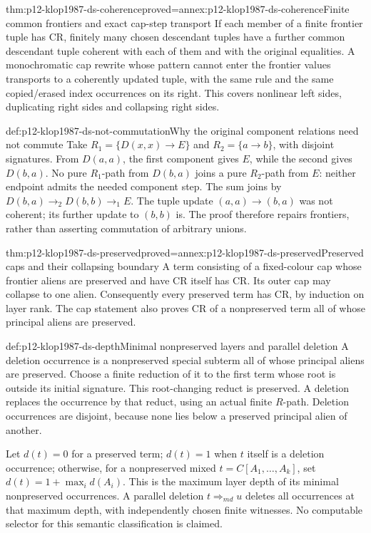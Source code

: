 \begin{hblemma}{thm:p12-klop1987-ds-coherence}{proved=annex:p12-klop1987-ds-coherence}{Finite common frontiers and exact cap-step transport}
If each member of a finite frontier tuple has CR, finitely many
chosen descendant tuples have a further common descendant tuple
coherent with each of them and with the original equalities.
A monochromatic cap rewrite whose pattern cannot enter the frontier
values transports to a coherently updated tuple, with the same
rule and the same copied/erased index occurrences on its right.
This covers nonlinear left sides, duplicating right sides and
collapsing right sides.
\end{hblemma}

\begin{hbexample}{def:p12-klop1987-ds-not-commutation}{Why the original component relations need not commute}
Take \(R_1=\{D(x,x)\to E\}\) and \(R_2=\{a\to b\}\),
with disjoint signatures. From \(D(a,a)\), the first component
gives \(E\), while the second gives \(D(b,a)\). No pure
\(R_1\)-path from \(D(b,a)\) joins a pure \(R_2\)-path
from \(E\): neither endpoint admits the needed component step.
The sum joins by \(D(b,a)\to_2D(b,b)\to_1E\).
The tuple update \((a,a)\to(b,a)\) was not coherent; its
further update to \((b,b)\) is. The proof therefore repairs
frontiers, rather than asserting commutation of arbitrary unions.
\end{hbexample}

\begin{hblemma}{thm:p12-klop1987-ds-preserved}{proved=annex:p12-klop1987-ds-preserved}{Preserved caps and their collapsing boundary}
A term consisting of a fixed-colour cap whose frontier aliens are
preserved and have CR itself has CR. Its outer cap may collapse
to one alien. Consequently every preserved term has CR, by
induction on layer rank. The cap statement also proves CR of a
nonpreserved term all of whose principal aliens are preserved.
\end{hblemma}

\begin{hbdefinition}{def:p12-klop1987-ds-depth}{Minimal nonpreserved layers and parallel deletion}
A deletion occurrence is a nonpreserved special subterm all of
whose principal aliens are preserved. Choose a finite reduction
of it to the first term whose root is outside its initial signature.
This root-changing reduct is preserved. A deletion replaces the
occurrence by that reduct, using an actual finite \(R\)-path.
Deletion occurrences are disjoint, because none lies below a
preserved principal alien of another.

Let \(d(t)=0\) for a preserved term; \(d(t)=1\) when \(t\)
itself is a deletion occurrence; otherwise, for a nonpreserved
mixed \(t=C[A_1,\ldots,A_k]\), set
\(d(t)=1+\max_i d(A_i)\). This is the maximum layer depth
of its minimal nonpreserved occurrences. A parallel deletion
\(t\Rightarrow_{
m d}u\) deletes all occurrences at that
maximum depth, with independently chosen finite witnesses.
No computable selector for this semantic classification is claimed.
\end{hbdefinition}

